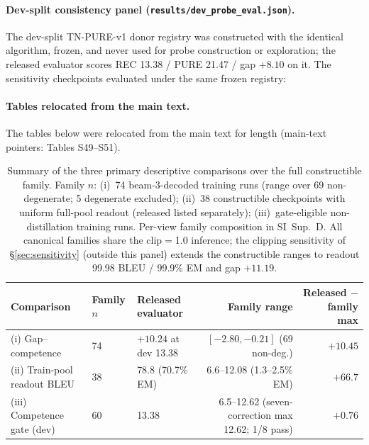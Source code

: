 \documentclass[pdflatex,sn-chicago]{sn-jnl}
\begin{document}
\clearpage
\paragraph{Dev-split consistency panel (\texttt{results/dev\_probe\_eval.json}).}
The dev-split TN-PURE-v1 donor registry was constructed with the identical algorithm, frozen, and never used for probe construction or exploration; the released evaluator scores REC 13.38 / PURE 21.47 / gap $+8.10$ on it. The sensitivity checkpoints evaluated under the same frozen registry:

\clearpage
\paragraph{Tables relocated from the main text.}
The tables below were relocated from the main text for length (main-text pointers: Tables S49--S51).

\begin{table}[h]
\centering
\scriptsize\setlength{\tabcolsep}{3pt}
\caption{Summary of the three primary descriptive comparisons over the full constructible family. Family $n$: (i)~74 beam-3-decoded training runs (range over 69 non-degenerate; 5 degenerate excluded); (ii)~38 constructible checkpoints with uniform full-pool readout (released listed separately); (iii)~gate-eligible non-distillation training runs. Per-view family composition in SI~Sup.~D. All canonical families share the clip$=$1.0 inference; the clipping sensitivity of \S\ref{sec:sensitivity} (outside this panel) extends the constructible ranges to readout 99.98 BLEU / 99.9\% EM and gap $+11.19$.}
\label{tab:diagnostic_summary}
\begin{tabular}{p{3.0cm}p{1.0cm}p{2.8cm}rr}
\toprule
Comparison & Family $n$ & Released evaluator & Family range & Released $-$ family max \\
\midrule
(i) Gap--competence & 74 & $+10.24$ at dev 13.38 & $[-2.80, -0.21]$ (69 non-deg.) & $+10.45$ \\
(ii) Train-pool readout BLEU & 38 & 78.8 (70.7\% EM) & 6.6--12.08 (1.3--2.5\% EM) & $+66.7$ \\
(iii) Competence gate (dev) & 60 & 13.38 & 6.5--12.62 (seven-correction max 12.62; 1/8 pass) & $+0.76$ \\
\bottomrule
\end{tabular}
\end{table}
\end{document}
